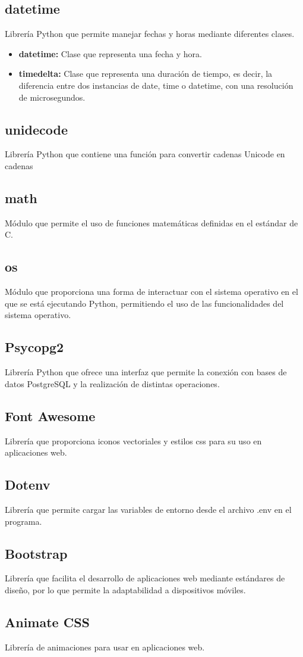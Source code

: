 \subsection{datetime}
\cite{datetime} Librería Python que permite manejar fechas y horas mediante diferentes clases.

\begin{itemize}
    \item \textbf{datetime:} Clase que representa una fecha y hora.
    \item \textbf{timedelta:} Clase que representa una duración de tiempo, es decir, la diferencia entre dos instancias de date, time o datetime, con una resolución de microsegundos.
\end{itemize}

\subsection{unidecode}
\cite{unidecode} Librería Python que contiene una función para convertir cadenas Unicode en cadenas 

\subsection{math}
\cite{math} Módulo que permite el uso de funciones matemáticas definidas en el estándar de C.

\subsection{os}
\cite{os} Módulo que proporciona una forma de interactuar con el sistema operativo en el que se está ejecutando Python, permitiendo el uso de las funcionalidades del sistema operativo.

\subsection{Psycopg2}
\cite{psycopg2} Librería Python que ofrece una interfaz que permite la conexión con bases de datos PostgreSQL y la realización de distintas operaciones.

\subsection{Font Awesome}
\cite{font} Librería que proporciona iconos vectoriales y estilos css para su uso en aplicaciones web.

\subsection{Dotenv}
\cite{dotenv} Librería que permite cargar las variables de entorno desde el archivo .env en el programa.

\subsection{Bootstrap}
\cite{bootstrap} Librería que facilita el desarrollo de aplicaciones web mediante estándares de diseño, por lo que permite la adaptabilidad a dispositivos móviles.

\subsection{Animate CSS}
Librería de animaciones para usar en aplicaciones web. 